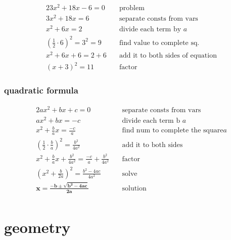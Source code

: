 \documentclass[a4paper,12pt]{article}
\begin{document}
\begin{alignat*}{2}
    3x^{2}+18x-6=0 &\quad \text{problem} \\
    3x^{2}+18x=6 &\quad \text{separate consts from vars} \\
    x^{2}+6x=2 &\quad \text{divide each term by } a \\
    \left(\frac{1}{2} \cdot 6\right)^{2} = 3^{2} = 9 &\quad \text{find value to complete
    sq.} \\
    x^{2}+6x+6=2+6 &\quad \text{add it to both sides of equation} \\
    (x+3)^{2} = 11 &\quad \text{factor}
\end{alignat*}

\subsubsection{quadratic formula}

\begin{alignat*}{2}
    ax^{2}+bx+c=0 &\quad \text{separate consts from vars} \\
    ax^{2}+bx=-c &\quad \text{divide each term b } a \\
    x^{2}+\frac{b}{a}x=\frac{-c}{a} &\quad \text{find num to complete the square} a \\
\left(\frac{1}{2}\cdot\frac{b}{a}\right)^{2} = \frac{b^{2}}{4a^{2}} & \quad
\text{add it to both sides} \\
    x^{2}+\frac{b}{a}x+\frac{b^{2}}{4a^{2}}=\frac{-c}{a}+\frac{b^{2}}{4a^{2} }&\quad \text{factor} \\
    \left(x^{2}+\frac{b}{2a}\right)^{2} = \frac{b^{2}-4ac}{4a^{2}} &\quad \text{solve} \\
    \mathbf{x=\frac{-b\pm\sqrt{b^{2}-4ac}}{2a}} &\quad \text{solution} \\
\end{alignat*}

\section{geometry}
\end{document}
